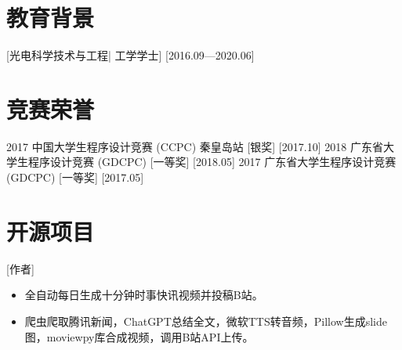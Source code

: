 \documentclass{resume}
\begin{document}
\section{教育背景}

[\textnormal{光电科学技术与工程|} 工学学士]
[2016.09—2020.06]

\section{竞赛荣誉}

\ResumeItem
{2017 中国大学生程序设计竞赛 (CCPC) 秦皇岛站}
[\textnormal{银奖}]
[2017.10]
\ResumeItem
{2018 广东省大学生程序设计竞赛 (GDCPC)}
[\textnormal{一等奖}]
[2018.05]
\ResumeItem
{2017 广东省大学生程序设计竞赛 (GDCPC)}
[\textnormal{一等奖}]
[2017.05]

\section{开源项目}

[作者]
\begin{itemize}
  \item 全自动每日生成十分钟时事快讯视频并投稿B站。
  \item 爬虫爬取腾讯新闻，ChatGPT总结全文，微软TTS转音频，Pillow生成slide图，moviewpy库合成视频，调用B站API上传。
\end{itemize}
\end{document}
